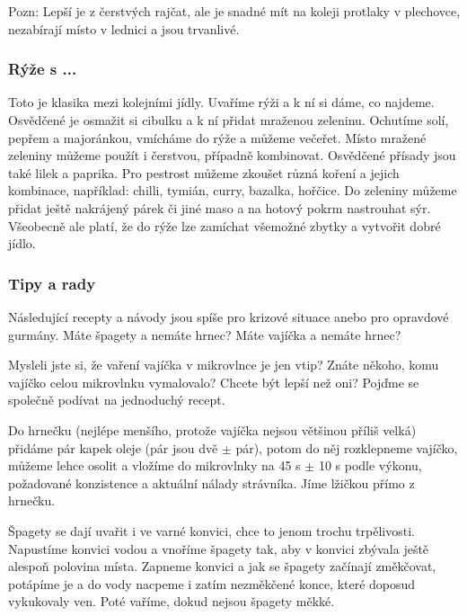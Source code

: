 Pozn: Lepší je z čerstvých rajčat, ale je snadné mít na koleji protlaky v
plechovce, nezabírají místo v lednici a jsou trvanlivé.

\subsubsection*{Rýže s ...}
Toto je klasika mezi kolejními jídly. Uvaříme rýži a k ní si dáme, co najdeme.
Osvědčené je osmažit si cibulku a k ní přidat mraženou zeleninu. Ochutíme solí,
pepřem a majoránkou, vmícháme do rýže a můžeme večeřet. Místo mražené zeleniny
můžeme použít i čerstvou, případně kombinovat. Osvědčené přísady jsou také lilek
a paprika. Pro pestrost můžeme zkoušet různá koření a jejich kombinace,
například: chilli, tymián, curry, bazalka, hořčice. Do zeleniny můžeme přidat
ještě nakrájený párek či jiné maso a na hotový pokrm nastrouhat sýr. Všeobecně
ale platí, že do rýže lze zamíchat všemožné zbytky a vytvořit dobré jídlo.

\subsubsection*{Tipy a rady}
Následující recepty a návody jsou spíše pro krizové situace anebo pro opravdové
gurmány. Máte špagety a nemáte hrnec? Máte vajíčka a nemáte hrnec?

Mysleli jste si, že vaření vajíčka v mikrovlnce je jen vtip? Znáte někoho, komu
vajíčko celou mikrovlnku vymalovalo? Chcete být lepší než oni? Pojďme se
společně podívat na jednoduchý recept.

Do hrnečku (nejlépe menšího, protože vajíčka nejsou většinou příliš velká)
přidáme pár kapek oleje (pár jsou dvě $\pm$ pár), potom do něj rozklepneme
vajíčko, můžeme lehce osolit a vložíme do mikrovlnky na 45 s $\pm$ 10 s podle
výkonu, požadované konzistence a aktuální nálady strávníka. Jíme lžičkou přímo z
hrnečku.

Špagety se dají uvařit i ve varné konvici, chce to jenom trochu trpělivosti.
Napustíme konvici vodou a vnoříme špagety tak, aby v konvici zbývala ještě
alespoň polovina místa. Zapneme konvici a jak se špagety začínají změkčovat,
potápíme je a do vody nacpeme i zatím nezměkčené konce, které doposud vykukovaly
ven. Poté vaříme, dokud nejsou špagety měkké.

